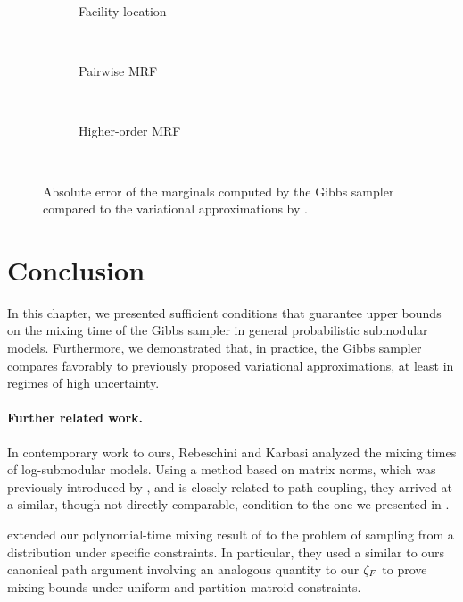 \setlength{}
\setlength{}
\renewcommand{\subflen}{\textwidth}
\begin{figure}[tb]
  \begin{subfigure}[b]{\subflen}
    \centering
    
    \caption{Facility location}
    \label{fig:gibbs_exp1}
  \end{subfigure}\\[0.5em]
  \begin{subfigure}[b]{\subflen}
    \centering
    
    \caption{Pairwise MRF}
    \label{fig:gibbs_exp2}
  \end{subfigure}\\[0.5em]
  \begin{subfigure}[b]{\subflen}
    \centering
    
    \caption{Higher-order MRF}
    \label{fig:gibbs_exp3}
  \end{subfigure}\\[-1em]
  \caption{Absolute error of the marginals computed by the Gibbs sampler compared to the variational approximations by \cite{djolonga14}.}
  \label{fig:gibbs_exp}
\end{figure}


\section{Conclusion}
In this chapter, we presented sufficient conditions that guarantee upper bounds on the mixing time of the Gibbs sampler in general probabilistic submodular models.
Furthermore, we demonstrated that, in practice, the Gibbs sampler compares favorably to previously proposed variational approximations, at least in regimes of high uncertainty.

\paragraph{Further related work.}
In contemporary work to ours, Rebeschini and Karbasi \citep{rebeschini15} analyzed the mixing times of log-submodular models.
Using a method based on matrix norms, which was previously introduced by \cite{dyer09}, and is closely related to path coupling, they arrived at a similar, though not directly comparable, condition to the one we presented in .

\cite{li16} extended our polynomial-time mixing result of  to the problem of sampling from a distribution under specific constraints.
In particular, they used a similar to ours canonical path argument involving an analogous quantity to our $\zeta_F$ to prove mixing bounds under uniform and partition matroid constraints.

